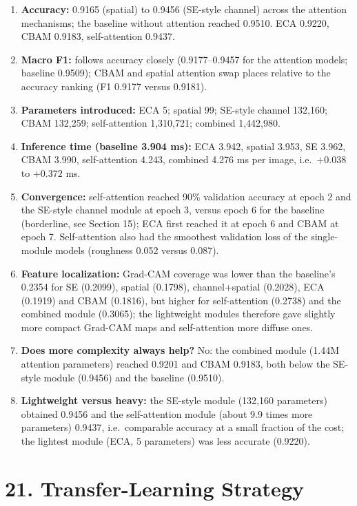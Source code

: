 \documentclass[10pt]{article}
\begin{document}
\begin{enumerate}
\item \textbf{Accuracy:} 0.9165 (spatial) to 0.9456 (SE-style channel) across the attention mechanisms; the baseline without attention reached 0.9510. ECA 0.9220, CBAM 0.9183, self-attention 0.9437.
\item \textbf{Macro F1:} follows accuracy closely (0.9177--0.9457 for the attention models; baseline 0.9509); CBAM and spatial attention swap places relative to the accuracy ranking (F1 0.9177 versus 0.9181).
\item \textbf{Parameters introduced:} ECA 5; spatial 99; SE-style channel 132{,}160; CBAM 132{,}259; self-attention 1{,}310{,}721; combined 1{,}442{,}980.
\item \textbf{Inference time (baseline 3.904 ms):} ECA 3.942, spatial 3.953, SE 3.962, CBAM 3.990, self-attention 4.243, combined 4.276 ms per image, i.e.\ $+0.038$ to $+0.372$ ms.
\item \textbf{Convergence:} self-attention reached 90\% validation accuracy at epoch 2 and the SE-style channel module at epoch 3, versus epoch 6 for the baseline (borderline, see Section 15); ECA first reached it at epoch 6 and CBAM at epoch 7. Self-attention also had the smoothest validation loss of the single-module models (roughness 0.052 versus 0.087).
\item \textbf{Feature localization:} Grad-CAM coverage was lower than the baseline's 0.2354 for SE (0.2099), spatial (0.1798), channel+spatial (0.2028), ECA (0.1919) and CBAM (0.1816), but higher for self-attention (0.2738) and the combined module (0.3065); the lightweight modules therefore gave slightly more compact Grad-CAM maps and self-attention more diffuse ones.
\item \textbf{Does more complexity always help?} No: the combined module (1.44M attention parameters) reached 0.9201 and CBAM 0.9183, both below the SE-style module (0.9456) and the baseline (0.9510).
\item \textbf{Lightweight versus heavy:} the SE-style module (132{,}160 parameters) obtained 0.9456 and the self-attention module (about 9.9 times more parameters) 0.9437, i.e.\ comparable accuracy at a small fraction of the cost; the lightest module (ECA, 5 parameters) was less accurate (0.9220).
\end{enumerate}

\section*{21. Transfer-Learning Strategy}
\end{document}
